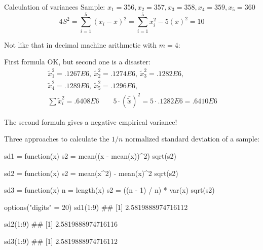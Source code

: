 \begin{vbframe}{Calculation of variances}
Sample: $x_1 = 356, x_2 = 357, x_3 = 358, x_4 = 359, x_5 = 360$
$$
4 S^2 = \sum\limits_{i=1}^5 (x_i - \bar x)^2 = \sum\limits_{i=1}^5 x_i^2 - 5(\bar x)^2 = 10
$$

Not like that in decimal machine arithmetic with $m=4$:

\lz 

First formula OK, but second one is a disaster:
\begin{eqnarray*}
&\tilde x_1^2 = .1267E6,\ \tilde x_2^2 = .1274E6,\ \tilde x_3^2 = .1282E6, & \\\
&\tilde x_4^2 = .1289E6,\ \tilde x_5^2 = .1296E6, & \\
&\sum \tilde x_i^2 = .6408E6 \qquad 5 \cdot (\bar {\tilde x})^2 = 5 \cdot .1282E6 = .6410E6&
\end{eqnarray*}

The second formula gives a negative empirical variance!


\framebreak

Three approaches to calculate the $1/n$ normalized standard deviation of a sample:
\lz
\footnotesize
\begin{verbbox}
sd1 = function(x) {
  s2 = mean((x - mean(x))^2)
  sqrt(s2)
}
\end{verbbox}
\col
\vspace{0.1cm}
\begin{verbbox}
sd2 = function(x) {
  s2 = mean(x^2) - mean(x)^2
  sqrt(s2)
}
\end{verbbox}
\col
\vspace{0.1cm}
\begin{verbbox}
sd3 = function(x) {
  n = length(x)
  s2 = ((n - 1) / n) * var(x)
  sqrt(s2)
}
\end{verbbox}
\col

\framebreak
\lz

\begin{verbbox}
options("digits" = 20)
sd1(1:9)
## [1] 2.5819888974716112
\end{verbbox}
\col
\vspace{0.3cm}
\begin{verbbox}
sd2(1:9)
## [1] 2.5819888974716116
\end{verbbox}
\col
\vspace{0.3cm}
\begin{verbbox}
sd3(1:9)
## [1] 2.5819888974716112
\end{verbbox}
\col

\normalsize
\framebreak


\end{vbframe}
